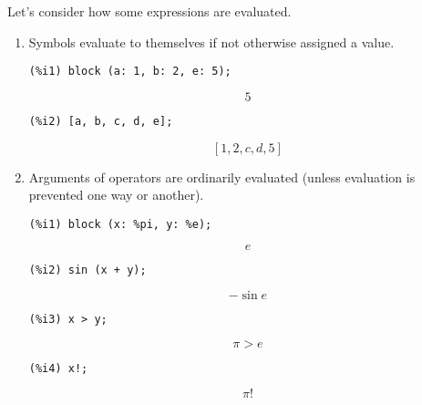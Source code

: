 \documentclass[12pt,leqno]{article}
\begin{document}
Let's consider how some expressions are evaluated.

\begin{enumerate}

\item Symbols evaluate to themselves if not otherwise assigned a value.
\begin{verbatim}
(%i1) block (a: 1, b: 2, e: 5);
\end{verbatim}
\begin{equation}
5\tag{\%o1}
\label{eq:doc-group1-code12-1-1}
\end{equation}
\begin{verbatim}
(%i2) [a, b, c, d, e];
\end{verbatim}
\begin{equation}
\left[ 1 , 2 , c , d , 5 \right] \tag{\%o2}
\label{eq:doc-group1-code12-2-1}
\end{equation}


\item Arguments of operators are ordinarily evaluated (unless evaluation is prevented one way or another).
\begin{verbatim}
(%i1) block (x: %pi, y: %e);
\end{verbatim}
\begin{equation}
e\tag{\%o1}
\label{eq:doc-group1-code13-1-1}
\end{equation}
\begin{verbatim}
(%i2) sin (x + y);
\end{verbatim}
\begin{equation}
-\sin e\tag{\%o2}
\label{eq:doc-group1-code13-2-1}
\end{equation}
\begin{verbatim}
(%i3) x > y;
\end{verbatim}
\begin{equation}
\pi>e\tag{\%o3}
\label{eq:doc-group1-code13-3-1}
\end{equation}
\begin{verbatim}
(%i4) x!;
\end{verbatim}
\begin{equation}
\pi!\tag{\%o4}
\label{eq:doc-group1-code13-4-1}
\end{equation}



\end{enumerate}
\end{document}
